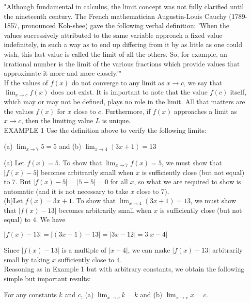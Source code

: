 \documentclass{article}
\begin{document}
"Although fundamental in calculus, the limit concept was not fully clarified until the nineteenth century. The French mathematician Augustin-Louis Cauchy (1789-1857, pronounced Koh-shee) gave the following verbal definition: 'When the values successively attributed to the same variable approach a fixed value indefinitely, in such a way as to end up differing from it by as little as one could wish, this last value is called the limit of all the others. So, for example, an irrational number is the limit of the various fractions which provide values that approximate it more and more closely.'"\\

If the values of $f(x)$ do not converge to any limit as $x \to c$, we say that $\lim_{x \to c}f(x)$ does not exist. It is important to note that the value $f(c)$ itself, which may or may not be defined, plays no role in the limit. All that matters are the values $f(x)$ for $x$ close to $c$. Furthermore, if $f(x)$ approaches a limit as $x \to c$, then the limiting value $L$ is unique.\\

EXAMPLE 1 Use the definition above to verify the following limits:
\begin{center}
(a) $\lim_{x \to 7}5 = 5$ and (b) $\lim_{x \to 4}(3x + 1) = 13$
\end{center}
(a) Let $f(x) = 5$. To show that $\lim_{x \to 7}f(x) = 5$, we must show that $\left|f(x) - 5\right|$ becomes arbitrarily small when $x$ is sufficiently close (but not equal) to 7. But $\left|f(x)-5\right| = \left|5 - 5\right| = 0$ for all $x$, so what we are required to show is automatic (and it is not necessary to take $x$ close to 7).\\

\noindent(b)Let $f(x) = 3x+1$. To show that $\lim_{x \to 4}(3x + 1) = 13$, we must show that $\left|f(x) - 13\right|$ becomes arbitrarily small when $x$ is sufficiently close (but not equal) to 4. We have
\begin{center}$\left|f(x) - 13\right| = \left|(3x+1) - 13\right| = \left|3x - 12\right| = 3\left|x - 4\right|$\end{center}
Since $\left|f(x) - 13\right|$ is a multiple of $\left|x - 4\right|$, we can make $\left|f(x) - 13\right|$ arbitrarily small by taking $x$ sufficiently close to 4.\\

Reasoning as in Example 1 but with arbitrary constants, we obtain the following simple but important results:
\begin{center}For any constants $k$ and $c$, (a) $\lim_{x \to c}k = k$ and (b) $\lim_{x \to c}x = c$.\end{center}
\end{document}
